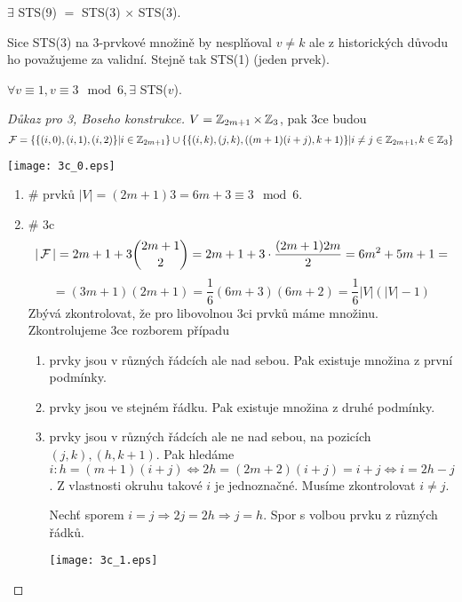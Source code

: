 \begin{consequence}[STS(9)]
	$\exists$ STS(9) $=$ STS(3) $\times$ STS(3).

	Sice STS(3) na 3-prvkové množině by nesplňoval $v \ne k$ ale z historických důvodu ho považujeme za validní.
	Stejně tak STS(1) (jeden prvek).
\end{consequence}

\begin{exercise}
\end{exercise}

\begin{theorem}
    $\forall v\equiv 1, v\equiv 3\mod 6, \exists$ STS($v$).
\end{theorem}
\begin{proof}[Důkaz pro 3, Boseho konstrukce]
	$V = \operatorname{\mathbb{Z}}_{2m + 1} \times \operatorname{\mathbb{Z}}_3$, pak 3ce budou
	\[ \operatorname{\mathcal{F}} = \{ \{(i, 0), (i, 1), (i, 2) \}| i \in \operatorname{\mathbb{Z}}_{2m + 1} \} \cup \{ \{ (i, k), (j, k), ((m+1)(i + j), k + 1) \} | i \ne j \in \operatorname{\mathbb{Z}}_{2m + 1}, k \in \operatorname{\mathbb{Z}}_3 \} \]

	\texttt{[image: 3c\_0.eps]}

	\begin{enumerate}
		\item \# prvků $|V| = (2m + 1)3 = 6m + 3 \equiv 3 \mod 6$.
		\item \# 3c
			\[ |\operatorname{\mathcal{F}}| = 2m + 1 + 3 \binom{2m + 1}{2} = 2m + 1 + 3 \cdot \frac{(2m + 1)2m}{2} = 6m^2 + 5m + 1 = \]
			\[ = (3m + 1)(2m + 1) = \frac{1}{6} (6m + 3)(6m + 2) = \frac{1}{6} |V|(|V| - 1) \]
			Zbývá zkontrolovat, že pro libovolnou 3ci prvků máme množinu.
			Zkontrolujeme 3ce rozborem případu
			\begin{enumerate}
				\item prvky jsou v různých řádcích ale nad sebou.
					Pak existuje množina z první podmínky.
				\item prvky jsou ve stejném řádku.
					Pak existuje množina z druhé podmínky.
				\item prvky jsou v různých řádcích ale ne nad sebou, na pozicích $(j, k), (h, k + 1)$.
					Pak hledáme $i: h = (m + 1)(i + j) \iff 2h = (2m + 2)(i + j) = i + j \iff i = 2h - j$.
					Z vlastnosti okruhu takové $i$ je jednoznačné.
					Musíme zkontrolovat $i \ne j$.

					Nechť sporem $i = j \Rightarrow 2j = 2h \Rightarrow j = h$.
					Spor s volbou prvku z různých řádků.

				\texttt{[image: 3c\_1.eps]}
			\end{enumerate}
	\end{enumerate}
\end{proof}
